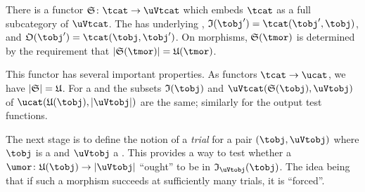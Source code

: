 \documentclass[%
12pt,%
arxiv,%
defaults
]{myclass}
\begin{document}
\begin{lemma}
\label{lem:tembed}
There is a functor \(\sfunc \colon \tcat \to \uVtcat\) which embeds \(\tcat\) as a full subcategory of \(\uVtcat\).
The \uVtobj[\sfunc(\tobj)] has underlying \uobj[\ufunc(\tobj)],  \itest \(\itest(\tobj') = \Hom{\tcat}{\tobj'}{\tobj}\), and \otest \(\otest(\tobj') = \Hom{\tcat}{\tobj}{\tobj'}\).
On morphisms, \(\sfunc(\tmor)\) is determined by the requirement that \(\forfunc[\sfunc(\tmor)] = \ufunc(\tmor)\).

This functor has several important properties.
As functors \(\tcat \to \ucat\), we have \(\forfunc[\sfunc] = \ufunc\).
For a \uVtobj[\uVtobj] and \tobj[\tobj] the subsets \(\itest(\tobj)\) and \(\Hom{\uVtcat}{\sfunc(\tobj)}{\uVtobj}\) of \(\Hom{\ucat}{\ufunc(\tobj)}{\abs{\uVtobj}}\) are the same; similarly for the output test functions.
\noproof
\end{lemma}

The next stage is to define the notion of a \emph{trial} for a pair \((\tobj,\uVtobj)\) where \(\tobj\) is a \tobj and \(\uVtobj\) a \uVtobj.
This provides a way to test whether a \umor  \(\umor \colon \ufunc(\tobj) \to \abs{\uVtobj}\) ``ought'' to be in \(\itest_{\uVtobj}(\tobj)\).
The idea being that if such a morphism succeeds at sufficiently many trials, it is ``forced''.
\end{document}
